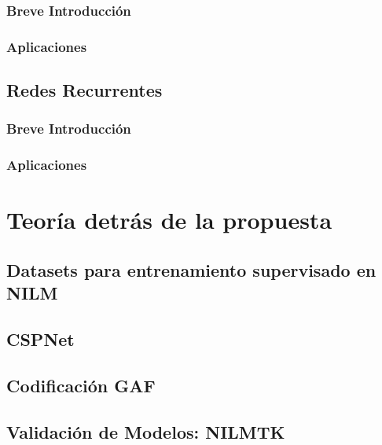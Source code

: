 \subsubsection{Breve Introducción}
\subsubsection{Aplicaciones}

\subsection{Redes Recurrentes}
\subsubsection{Breve Introducción}
\subsubsection{Aplicaciones}

\section{Teoría detrás de la propuesta}
\subsection{Datasets para entrenamiento supervisado en NILM}
\subsection{CSPNet}     
\subsection{Codificación GAF} 
\subsection{Validación de Modelos: NILMTK}  


